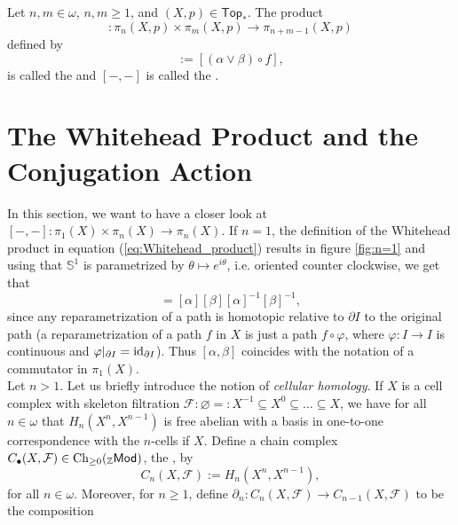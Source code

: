 \begin{definition}
	Let $n,m \in \omega$, $n,m \geq 1$, and $(X,p) \in \mathsf{Top}_\ast$. The product
	\begin{equation*}
		[-,-] : \pi_n(X,p) \times \pi_m(X,p) \to \pi_{n + m - 1}(X,p)
	\end{equation*}
	\noindent defined by
	\begin{equation*}
		[\alpha,\beta] := [(\alpha \vee \beta) \circ f], 
	\end{equation*}
	\noindent is called the  and $[-,-]$ is called the .
\end{definition}

\section{The Whitehead Product and the Conjugation Action}
In this section, we want to have a closer look at $[-,-] : \pi_1(X) \times \pi_n(X) \to \pi_n(X)$. If $n = 1$, the definition of the Whitehead product in equation (\ref{eq:Whitehead_product}) results in figure \ref{fig:n=1} and using that $\mathbb{S}^1$ is parametrized by $\theta \mapsto e^{i\theta}$, i.e. oriented counter clockwise, we get that
\begin{equation*}
	[\alpha,\beta] = [\alpha][\beta][\alpha]^{-1}[\beta]^{-1},
\end{equation*}
\noindent since any reparametrization of a path is homotopic relative to $\partial I$ to the original path (a reparametrization of a path $f$ in $X$ is just a path $f \circ \varphi$, where $\varphi : I \to I$ is continuous and $\varphi\vert_{\partial I} = \operatorname{id}_{\partial I}$). Thus $[\alpha,\beta]$ coincides with the notation of a commutator in $\pi_1(X)$.\\
Let $n > 1$. Let us briefly introduce the notion of \emph{cellular homology}. If $X$ is a cell complex with skeleton filtration $\mathcal{F} : \varnothing =: X^{-1} \subseteq X^0 \subseteq \dots \subseteq X$, we have for all $n \in \omega$ that $H_n(X^n,X^{n - 1})$ is free abelian with a basis in one-to-one correspondence with the $n$-cells if $X$. Define a chain complex $C_\bullet(X,\mathcal{F}) \in \operatorname{Ch}_{\geq 0}(_{\mathbb{Z}}\mathsf{Mod})$, the , by 
\begin{equation*}
	C_n(X,\mathcal{F}) := H_n(X^n,X^{n - 1}),
\end{equation*}
\noindent for all $n \in \omega$. Moreover, for $n \geq 1$, define $\partial_n : C_n(X,\mathcal{F}) \to C_{n - 1}(X,\mathcal{F})$ to be the composition
